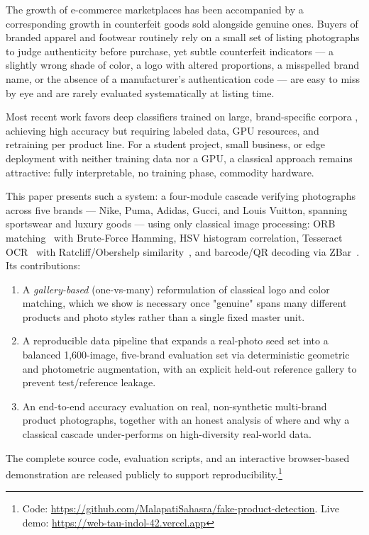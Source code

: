 \documentclass[conference]{IEEEtran}
\begin{document}
The growth of e-commerce marketplaces has been accompanied by a
corresponding growth in counterfeit goods sold alongside genuine ones.
Buyers of branded apparel and footwear routinely rely on a small set of
listing photographs to judge authenticity before purchase, yet subtle
counterfeit indicators --- a slightly wrong shade of color, a logo with
altered proportions, a misspelled brand name, or the absence of a
manufacturer's authentication code --- are easy to miss by eye and are
rarely evaluated systematically at listing time.

Most recent work favors deep classifiers trained on large, brand-specific
corpora \cite{footwear2024}, achieving high accuracy but requiring
labeled data, GPU resources, and retraining per product line. For a
student project, small business, or edge deployment with neither
training data nor a GPU, a classical approach remains attractive: fully
interpretable, no training phase, commodity hardware.

This paper presents such a system: a four-module cascade verifying
photographs across five brands --- Nike, Puma, Adidas, Gucci, and Louis
Vuitton, spanning sportswear and luxury goods --- using only classical
image processing: ORB matching~\cite{orb2011} with Brute-Force Hamming,
HSV histogram correlation, Tesseract OCR~\cite{tesseract2007} with
Ratcliff/Obershelp similarity~\cite{ratcliff1988}, and barcode/QR
decoding via ZBar~\cite{zbar}. Its contributions:

\begin{enumerate}
    \item A \emph{gallery-based} (one-vs-many) reformulation of classical
    logo and color matching, which we show is necessary once "genuine"
    spans many different products and photo styles rather than a single
    fixed master unit.
    \item A reproducible data pipeline that expands a real-photo seed set
    into a balanced 1{,}600-image, five-brand evaluation set via
    deterministic geometric and photometric augmentation, with an explicit
    held-out reference gallery to prevent test/reference leakage.
    \item An end-to-end accuracy evaluation on real, non-synthetic
    multi-brand product photographs, together with an honest analysis of
    where and why a classical cascade under-performs on high-diversity
    real-world data.
\end{enumerate}

The complete source code, evaluation scripts, and an interactive
browser-based demonstration are released publicly to support
reproducibility.\footnote{Code: \url{https://github.com/MalapatiSahasra/fake-product-detection}. Live demo: \url{https://web-tau-indol-42.vercel.app}}
\end{document}

